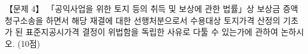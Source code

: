 \begin{longquestion}{【문제 4】}
「공익사업을 위한 토지 등의 취득 및 보상에 관한 법률」상 보상금 증액청구소송을 하면서 해당 재결에 대한 선행처분으로서 수용대상 토지가격 산정의 기초가 된 표준지공시가격 결정이 위법함을 독립한 사유로 다툴 수 있는가에 관하여 논하시오. (10점) \par
\end{longquestion}
